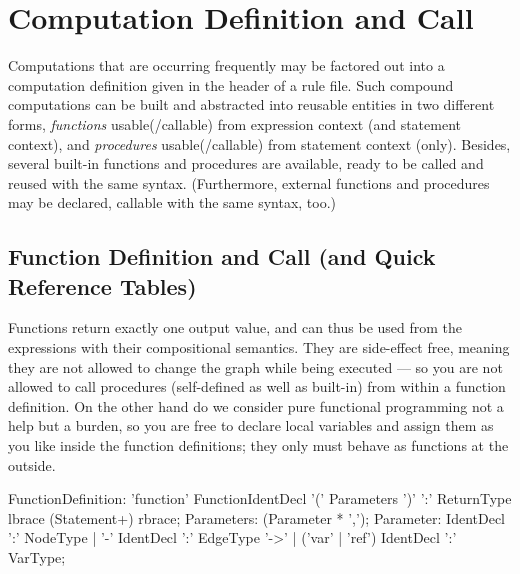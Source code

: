 \section{Computation Definition and Call} \label{sub:compdef}

Computations that are occurring frequently may be factored out into a computation definition given in the header of a rule file.
Such compound computations can be built and abstracted into reusable entities in two different forms, \emph{functions} usable(/callable) from expression context (and statement context), and \emph{procedures} usable(/callable) from statement context (only).
Besides, several built-in functions and procedures are available, ready to be called and reused with the same syntax.
(Furthermore, external functions and procedures may be declared, callable with the same syntax, too.)

\subsection{Function Definition and Call (and Quick Reference Tables)}\label{sub:functions}\label{sub:funccall} 

Functions return exactly one output value, and can thus be used from the expressions with their compositional semantics.
They are side-effect free, meaning they are not allowed to change the graph while being executed ---
so you are not allowed to call procedures (self-defined as well as built-in) from within a function definition.
On the other hand do we consider pure functional programming not a help but a burden, so you are free to declare local variables and assign them as you like inside the function definitions; they only must behave as functions at the outside.

\begin{rail} 
  FunctionDefinition: 
	'function' FunctionIdentDecl '(' Parameters ')' ':' ReturnType\\
	lbrace (Statement+) rbrace;
  Parameters: (Parameter * ',');
  Parameter: IdentDecl ':' NodeType |
  '-' IdentDecl ':' EdgeType '->' |
  ('var' | 'ref') IdentDecl ':' VarType;
\end{rail}

